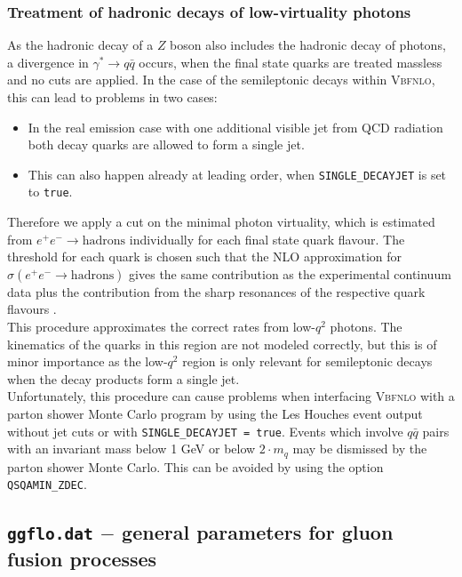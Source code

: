 \documentclass[english,12pt]{article}
\begin{document}
\subsubsection{Treatment of hadronic decays of low-virtuality photons}
\label{lowvirt}

      As the hadronic decay of a $Z$ boson also includes the hadronic decay of photons,
      a divergence in $\gamma^*\to q\bar{q}$ occurs, when the final state quarks are treated massless
      and no cuts are applied.
      In the case of the semileptonic decays within \textsc{Vbfnlo}, this can lead to problems in two cases:
      \begin{itemize}
       \item In the real emission case with one additional visible jet from QCD radiation both decay quarks
             are allowed to form a single jet. 
       \item This can also happen already at leading order, when {\tt SINGLE\_DECAYJET} is set to {\tt true}.
      \end{itemize}
      Therefore we apply a cut on the minimal photon virtuality, which is estimated from $e^+e^-\to \text{hadrons}$
      individually for each final state quark flavour. The threshold for each quark is chosen such
      that the NLO approximation for $\sigma(e^+e^-\to \text{hadrons})$ gives the same contribution as the experimental
      continuum data plus the contribution from the sharp resonances of the respective quark flavours \cite{Beringer:1900zz}.\\
      This procedure approximates the correct rates from low-$q^2$ photons. The kinematics of the quarks
      in this region are not modeled correctly, but this is of minor importance as the low-$q^2$ region
      is only relevant for semileptonic decays when the decay products form a single jet.\\
      Unfortunately, this procedure can cause problems when interfacing \textsc{Vbfnlo} with
      a parton shower Monte Carlo program by using the Les Houches event output without jet cuts or
      with {\tt SINGLE\_DECAYJET = true}.
      Events which involve $q\bar{q}$ pairs with an invariant mass below 1 GeV or below $2 \cdot m_q$ may
      be dismissed by the parton shower Monte Carlo. This can be avoided by using the option
      {\tt QSQAMIN\_ZDEC}.




\subsection{{\tt ggflo.dat} $-$ general parameters for gluon fusion processes}
\end{document}
